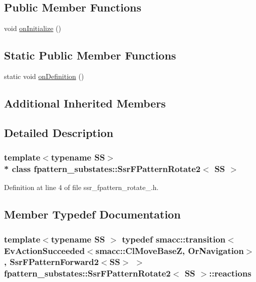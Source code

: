 \subsection*{Public Member Functions}
\begin{DoxyCompactItemize}
\item 
void \hyperlink{structfpattern__substates_1_1SsrFPatternRotate2_a22cd5162cc8313222bfb7260b38c18bd}{on\+Initialize} ()
\end{DoxyCompactItemize}
\subsection*{Static Public Member Functions}
\begin{DoxyCompactItemize}
\item 
static void \hyperlink{structfpattern__substates_1_1SsrFPatternRotate2_a60e36c89d07c502d91fd6a513bb0897b}{on\+Definition} ()
\end{DoxyCompactItemize}
\subsection*{Additional Inherited Members}


\subsection{Detailed Description}
\subsubsection*{template$<$typename SS$>$\\*
class fpattern\+\_\+substates\+::\+Ssr\+F\+Pattern\+Rotate2$<$ S\+S $>$}



Definition at line 4 of file ssr\+\_\+fpattern\+\_\+rotate\+\_.\+h.



\subsection{Member Typedef Documentation}
\subsubsection[{\texorpdfstring{reactions}{reactions}}]{\setlength{\rightskip}{0pt plus 5cm}template$<$typename SS $>$ typedef {\bf smacc\+::transition}$<$Ev\+Action\+Succeeded$<${\bf smacc\+::\+Cl\+Move\+BaseZ}, Or\+Navigation$>$, {\bf Ssr\+F\+Pattern\+Forward2}$<$SS$>$ $>$ {\bf fpattern\+\_\+substates\+::\+Ssr\+F\+Pattern\+Rotate2}$<$ SS $>$\+::{\bf reactions}}\hypertarget{structfpattern__substates_1_1SsrFPatternRotate2_a2e76850207998fffed0d3fc9fc636cf2}{}\label{structfpattern__substates_1_1SsrFPatternRotate2_a2e76850207998fffed0d3fc9fc636cf2}


